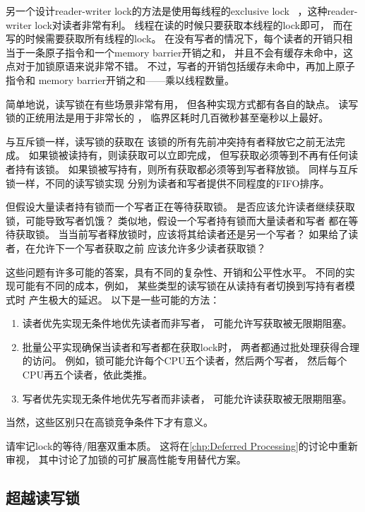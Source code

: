 另一个设计reader-writer lock的方法是使用每线程的exclusive lock
~\cite{WilsonCHsieh92a}，这种reader-writer lock对读者非常有利。
线程在读的时候只要获取本线程的lock即可，
而在写的时候需要获取所有线程的lock。
在没有写者的情况下，每个读者的开销只相当于一条原子指令和一个memory barrier开销之和，
并且不会有缓存未命中，这点对于加锁原语来说非常不错。
不过，写者的开销包括缓存未命中，再加上原子指令和
memory barrier开销之和——乘以线程数量。

简单地说，读写锁在有些场景非常有用，
但各种实现方式都有各自的缺点。
读写锁的正统用法是用于非常长的
，
临界区耗时几百微秒甚至毫秒以上最好。

与互斥锁一样，读写锁的获取在
该锁的所有先前冲突持有者释放它之前无法完成。
如果锁被读持有，则读获取可以立即完成，
但写获取必须等到不再有任何读者持有该锁。
如果锁被写持有，则所有获取都必须等到写者释放锁。
同样与互斥锁一样，不同的读写锁实现
分别为读者和写者提供不同程度的FIFO排序。

但假设大量读者持有锁而一个写者正在等待获取锁。
是否应该允许读者继续获取锁，可能导致写者饥饿？
类似地，假设一个写者持有锁而大量读者和写者
都在等待获取锁。
当当前写者释放锁时，应该将其给读者还是另一个写者？
如果给了读者，在允许下一个写者获取之前
应该允许多少读者获取锁？

这些问题有许多可能的答案，具有不同的复杂性、开销和公平性水平。
不同的实现可能有不同的成本，例如，
某些类型的读写锁在从读持有者切换到写持有者模式时
产生极大的延迟。
以下是一些可能的方法：

\begin{enumerate}
\item
	读者优先实现无条件地优先读者而非写者，
	可能允许写获取被无限期阻塞。
\item	批量公平实现确保当读者和写者都在获取lock时，
	两者都通过批处理获得合理的访问。
	例如，锁可能允许每个CPU五个读者，然后两个写者，
	然后每个CPU再五个读者，依此类推。
\item	写者优先实现无条件地优先写者而非读者，
	可能允许读获取被无限期阻塞。
\end{enumerate}

当然，这些区别只在高锁竞争条件下才有意义。

请牢记lock的等待/阻塞双重本质。
这将在\cref{chp:Deferred Processing}的讨论中重新审视，
其中讨论了加锁的可扩展高性能专用替代方案。

\subsection{超越读写锁}
\label{sec:locking:Beyond Reader-Writer Locks}

